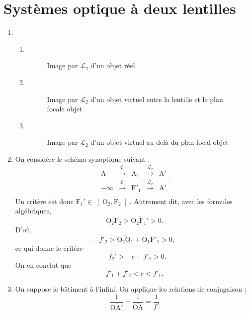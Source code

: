 \section{Systèmes optique à deux lentilles}

\begin{enumerate}
	\item
		\begin{enumerate}
			\item~\\
				\begin{figure}[H]
					\centering
					
					\caption{Image par $\mathcal{L}_2$ d'un objet réel}
				\end{figure}
			\item ~\\
				\begin{figure}[H]
					\centering
					
					\caption{Image par $\mathcal{L}_2$ d'un objet virtuel entre la lentille et le plan focale objet}
				\end{figure}
			\item ~\\
				\begin{figure}[H]
					\centering
					
					\caption{Image par $\mathcal{L}_2$ d'un objet virtuel au delà du plan focal objet}
				\end{figure}
		\end{enumerate}
	\item On considère le schéma synoptique suivant : \[
			\begin{array}{ccccc}
				\mathrm{A}&\xrightarrow{\mathcal{L}_1}&\mathrm{A}_1 & \xrightarrow{\mathcal{L}_2} & \mathrm{A}'\\
				-\infty&\xrightarrow{\mathcal{L}_1}&\mathrm{F}'_1 & \xrightarrow{\mathcal{L}_2} & \mathrm{A}'\\
			\end{array}
		.\]
		Un critère est donc $\mathrm{F}_1' \in \left]\mathrm{O_2}, \mathrm{F}_2\right[$. Autrement dit, avec les formules algébriques, \[
			\overline{\mathrm{O_2F_2}} > \overline{\mathrm{O_2F_1'}} > 0
		.\]
		D'où, \[
			-f'_2 > \overline{\mathrm{O_2O_1}} + \overline{\mathrm{O_1F'_1}} > 0
		,\] ce qui donne le critère \[
			-f_2' > -e + f'_1 > 0
		.\]
		On en conclut que \[
			f'_1 + f'_2 < e < f'_1
		.\]
	\item On suppose le bâtiment à l'infini. On applique les relations de conjugaison : \[
			\frac{1}{\overline{\mathrm{OA'}}} - \frac{1}{\overline{\mathrm{OA}}} = \frac{1}{f'}
\]
\end{enumerate}
